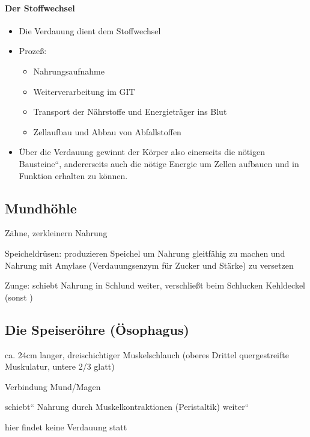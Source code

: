 \paragraph{Der Stoffwechsel}

\begin{itemize}
    \item Die Verdauung dient dem Stoffwechsel
    \item Proze{\ss}:
    \begin{itemize}
        \item Nahrungsaufnahme
        \item Weiterverarbeitung im GIT
        \item Transport der N\"ahrstoffe und Energietr\"ager  ins Blut
        \item Zellaufbau und Abbau von Abfallstoffen
    \end{itemize}
    \item \"Uber die Verdauung gewinnt der K\"orper  also einerseits die
    n\"otigen {\quotedblbase}Bausteine{\textquotedblleft},  andererseits
    auch die n\"otige Energie um  Zellen aufbauen und in Funktion erhalten
    zu k\"onnen.
\end{itemize}

\subsection{Mundh\"ohle}

Z\"ahne, zerkleinern Nahrung

Speicheldr\"usen: produzieren Speichel um Nahrung gleitf\"ahig zu machen
und Nahrung mit Amylase (Verdauungsenzym f\"ur Zucker und St\"arke) zu
versetzen

Zunge: schiebt Nahrung in Schlund weiter, verschlie{\ss}t beim Schlucken
Kehldeckel (sonst  )






\subsection{Die Speiser\"ohre (\"Osophagus)}

\gMarried
{ca. 24cm langer, dreischichtiger Muskelschlauch (oberes Drittel
quergestreifte Muskulatur, untere 2/3 glatt) 

Verbindung Mund/Magen

{\quotedblbase}schiebt{\textquotedblleft} Nahrung durch
Muskelkontraktionen (Peristaltik)
{\quotedblbase}weiter{\textquotedblleft}

hier findet keine Verdauung statt}
{}




